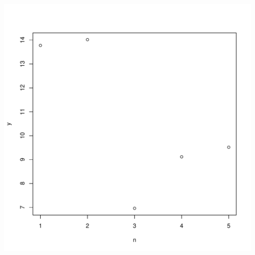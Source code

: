 \documentclass{article}\usepackage[]{graphicx}\usepackage[]{xcolor}
\makeatletter
\def\maxwidth{ %
  \ifdim\Gin@nat@width>\linewidth
    \linewidth
  \else
    \Gin@nat@width
  \fi
}
\newenvironment{knitrout}{}{} %
\makeatother
\begin{document}
\begin{knitrout}
\color{fgcolor}
\includegraphics[width=\maxwidth]{figure/Chunk02-1.pdf} 
\end{knitrout}
\end{document}
